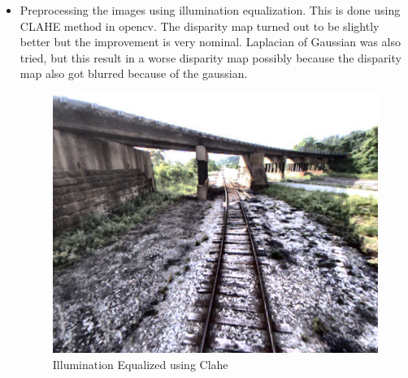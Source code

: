 \documentclass{article}
\begin{document}
\begin{itemize}
\item Preprocessing the images using illumination equalization. This is done using CLAHE method in opencv. The disparity map turned out to be slightly better but the improvement is very nominal. Laplacian of Gaussian was also tried, but this result in a worse disparity map possibly because the disparity map also got blurred because of the gaussian.
  \begin{figure}[H]
    \centering
    \includegraphics[scale=0.25]{images/clahe}
    \caption{Illumination Equalized using Clahe}
  \end{figure}

  
\end{itemize}
\end{document}
